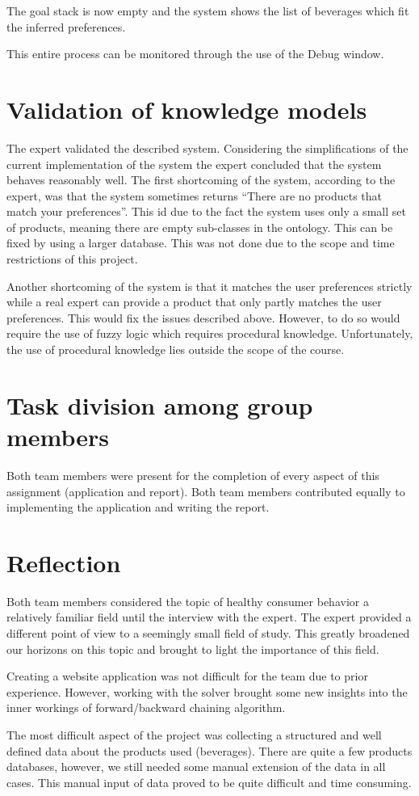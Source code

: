 \documentclass[11pt,a4paper]{article}
\begin{document}
The goal stack is now empty and the system shows the list of beverages which fit the inferred preferences.

This entire process can be monitored through the use of the Debug window.

\section{Validation of knowledge models} 

The expert validated the described system. Considering the simplifications of the current implementation of the system the expert concluded that the system behaves reasonably well. The first shortcoming of the system, according to the expert, was that the system sometimes returns ``There are no products that match your preferences''. This id due to the fact the system uses only a small set of products, meaning there are empty sub-classes in the ontology. This can be fixed by using a larger database. This was not done due to the scope and time restrictions of this project.

Another shortcoming of the system is that it matches the user preferences strictly while a real expert can provide a product that only partly matches the user preferences. This would fix the issues described above. However, to do so would require the use of fuzzy logic which requires procedural knowledge. Unfortunately, the use of procedural knowledge lies outside the scope of the course. 

\section{Task division among group members}

Both team members were present for the completion of every aspect of this assignment (application and report). Both team members contributed equally to implementing the application and writing the report.

\section{Reflection}

Both team members considered the topic of healthy consumer behavior a relatively familiar field until the interview with the expert. The expert provided a different point of view to a seemingly small field of study. This greatly broadened our horizons on this topic and brought to light the importance of this field. 

Creating a website application was not difficult for the team due to prior experience. However, working with the solver brought some new insights into the inner workings of forward/backward chaining algorithm.

The most difficult aspect of the project was collecting a structured and well defined data about the products used (beverages). There are quite a few products databases, however, we still needed some manual extension of the data in all cases. This manual input of data proved to be quite difficult and time consuming. 
\end{document}
